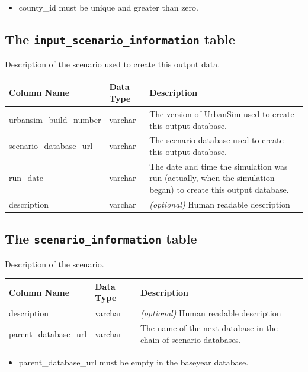 \begin{itemize} \tight
\item county_id must be unique and greater than zero.

\end{itemize}

\subsection{The {\tt input_scenario_information} table}


Description of the scenario used to create this output data.


\begin{tabular}{|l|l|p{3.6in}|}
\hline
\textbf{Column Name} & \textbf{Data Type} & \textbf{Description} \\
\hline
urbansim_build_number & varchar & The version of UrbanSim used to create this output database.  \\
\hline
scenario_database_url & varchar & The scenario database used to create this output database.  \\
\hline
run_date & varchar &  The date and time the simulation was run (actually, when the simulation began) to create this output database.  \\
\hline
description & varchar & \emph{(optional) }
Human readable description  \\
\hline

\end{tabular}


\subsection{The {\tt scenario_information} table}
\label{urbansim-database-tables-scenario-inforamtion}

Description of the scenario.


\begin{tabular}{|l|l|p{3.9in}|}
\hline
\textbf{Column Name} & \textbf{Data Type} & \textbf{Description} \\
\hline description & varchar & \emph{(optional) }
Human readable description  \\
\hline
parent_database_url & varchar & The name of the next database in the chain of scenario databases.  \\
\hline

\end{tabular}

\begin{itemize} \tight
\item parent_database_url must be empty in the baseyear database.

\end{itemize}

